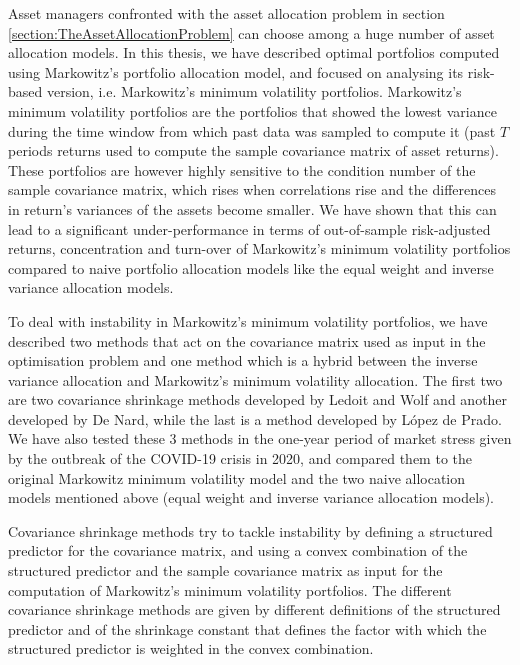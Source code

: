 
Asset managers confronted with the asset allocation problem in section \ref{section:TheAssetAllocationProblem} can choose among a huge number of asset allocation models. In this thesis, we have described optimal portfolios computed using Markowitz's portfolio allocation model, and focused on analysing its risk-based version, i.e. Markowitz's minimum volatility portfolios. Markowitz's minimum volatility portfolios are the portfolios that showed the lowest variance during the time window from which past data was sampled to compute it (past $T$ periods returns used to compute the sample covariance matrix of asset returns). These portfolios are however highly sensitive to the condition number of the sample covariance matrix, which rises when correlations rise and the differences in return's variances of the assets become smaller. We have shown that this can lead to a significant under-performance in terms of out-of-sample risk-adjusted returns, concentration and turn-over of Markowitz's minimum volatility portfolios compared to naive portfolio allocation models like the equal weight and inverse variance allocation models.

To deal with instability in Markowitz's minimum volatility portfolios, we have described two methods that act on the covariance matrix used as input in the optimisation problem and one method which is a hybrid between the inverse variance allocation and Markowitz's minimum volatility allocation. The first two are two covariance shrinkage methods developed by Ledoit and Wolf and another developed by De Nard, while the last is a method developed by López de Prado. We have also tested these 3 methods in the one-year period of market stress given by the outbreak of the COVID-19 crisis in 2020, and compared them to the original Markowitz minimum volatility model and the two naive allocation models mentioned above (equal weight and inverse variance allocation models).

Covariance shrinkage methods try to tackle instability by defining a structured predictor for the covariance matrix, and using a convex combination of the structured predictor and the sample covariance matrix as input for the computation of Markowitz's minimum volatility portfolios. The different covariance shrinkage methods are given by different definitions of the structured predictor and of the shrinkage constant that defines the factor with which the structured predictor is weighted in the convex combination.

